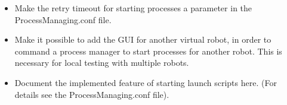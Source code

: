 \begin{itemize}
 \item Make the retry timeout for starting processes a parameter in the ProcessManaging.conf file.
 \item Make it possible to add the GUI for another virtual robot, in order to command a process manager to start processes for another robot. This is necessary for local testing with multiple robots.
 \item Document the implemented feature of starting launch scripts here. (For details see the ProcessManaging.conf file).
\end{itemize}







